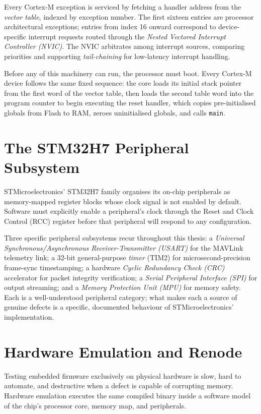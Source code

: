 Every Cortex-M exception is serviced by fetching a handler address from the \emph{vector table}, indexed by exception number. The first sixteen entries are processor architectural exceptions; entries from index 16 onward correspond to device-specific interrupt requests routed through the \emph{Nested Vectored Interrupt Controller (NVIC)}. The NVIC arbitrates among interrupt sources, comparing priorities and supporting \emph{tail-chaining} for low-latency interrupt handling.

Before any of this machinery can run, the processor must boot. Every Cortex-M device follows the same fixed sequence: the core loads its initial stack pointer from the first word of the vector table, then loads the second table word into the program counter to begin executing the reset handler, which copies pre-initialised globals from Flash to RAM, zeroes uninitialised globals, and calls \texttt{main}.

\section{The STM32H7 Peripheral Subsystem}

STMicroelectronics' STM32H7 family organises its on-chip peripherals as memory-mapped register blocks whose clock signal is not enabled by default. Software must explicitly enable a peripheral's clock through the Reset and Clock Control (RCC) register before that peripheral will respond to any configuration.

Three specific peripheral subsystems recur throughout this thesis: a \emph{Universal Synchronous/Asynchronous Receiver-Transmitter (USART)} for the MAVLink telemetry link; a 32-bit general-purpose \emph{timer} (TIM2) for microsecond-precision frame-sync timestamping; a hardware \emph{Cyclic Redundancy Check (CRC)} accelerator for packet integrity verification; a \emph{Serial Peripheral Interface (SPI)} for output streaming; and a \emph{Memory Protection Unit (MPU)} for memory safety. Each is a well-understood peripheral category; what makes each a source of genuine defects is a specific, documented behaviour of STMicroelectronics' implementation.

\section{Hardware Emulation and Renode}

Testing embedded firmware exclusively on physical hardware is slow, hard to automate, and destructive when a defect is capable of corrupting memory. Hardware emulation executes the same compiled binary inside a software model of the chip's processor core, memory map, and peripherals.


